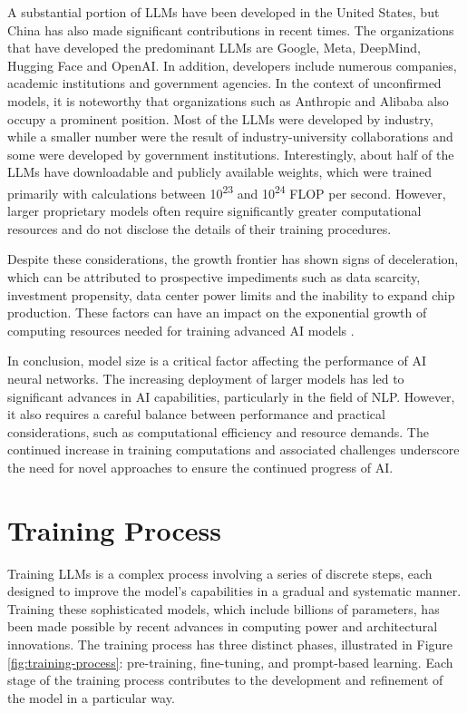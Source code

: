 A substantial portion of LLMs have been developed in the United States, but China has also made significant contributions in recent times. The organizations that have developed the predominant LLMs are Google, Meta, DeepMind, Hugging Face and OpenAI. In addition, developers include numerous companies, academic institutions and government agencies. In the context of unconfirmed models, it is noteworthy that organizations such as Anthropic and Alibaba also occupy a prominent position. Most of the LLMs were developed by industry, while a smaller number were the result of industry-university collaborations and some were developed by government institutions. Interestingly, about half of the LLMs have downloadable and publicly available weights, which were trained primarily with calculations between 10\textsuperscript{23} and 10\textsuperscript{24} FLOP per second. However, larger proprietary models often require significantly greater computational resources and do not disclose the details of their training procedures.

Despite these considerations, the growth frontier has shown signs of deceleration, which can be attributed to prospective impediments such as data scarcity, investment propensity, data center power limits and the inability to expand chip production. These factors can have an impact on the exponential growth of computing resources needed for training advanced AI models \cite{epoch2024trainingcomputeoffrontieraimodelsgrowsby45xperyear}.

In conclusion, model size is a critical factor affecting the performance of AI neural networks. The increasing deployment of larger models has led to significant advances in AI capabilities, particularly in the field of NLP. However, it also requires a careful balance between performance and practical considerations, such as computational efficiency and resource demands. The continued increase in training computations and associated challenges underscore the need for novel approaches to ensure the continued progress of AI.

\section{Training Process}

Training LLMs is a complex process involving a series of discrete steps, each designed to improve the model's capabilities in a gradual and systematic manner. Training these sophisticated models, which include billions of parameters, has been made possible by recent advances in computing power and architectural innovations. The training process has three distinct phases, illustrated in Figure \ref{fig:training-process}: pre-training, fine-tuning, and prompt-based learning. Each stage of the training process contributes to the development and refinement of the model in a particular way.

